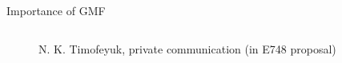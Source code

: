 \documentclass[aspectratio=43, dvipsnames]{beamer}
\begin{document}
\begin{frame}[t]{Importance of GMF}
\begin{columns}[T]
{\begin{figure}
                \caption{N. K. Timofeyuk, private communication (in E748 proposal)}
            \end{figure}
        }
    \end{columns}
    \begin{columns}[c]
        \begin{column}{0.78\linewidth}
        \end{column}
    \end{columns}
\end{frame}
\end{document}
